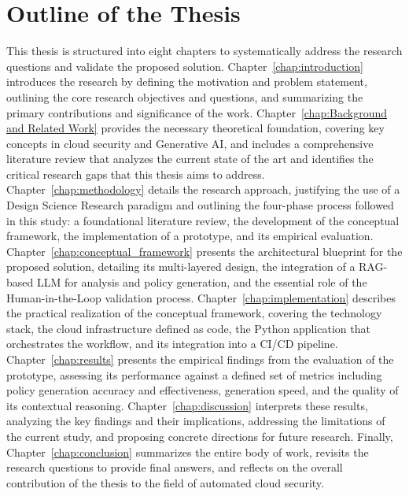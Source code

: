 \section{Outline of the Thesis}
\label{sec:outline}

This thesis is structured into eight chapters to systematically address the research questions and validate the proposed solution. Chapter~\ref{chap:introduction} introduces the research by defining the motivation and problem statement, outlining the core research objectives and questions, and summarizing the primary contributions and significance of the work. Chapter~\ref{chap:Background and Related Work} provides the necessary theoretical foundation, covering key concepts in cloud security and Generative AI, and includes a comprehensive literature review that analyzes the current state of the art and identifies the critical research gaps that this thesis aims to address. Chapter~\ref{chap:methodology} details the research approach, justifying the use of a Design Science Research paradigm and outlining the four-phase process followed in this study: a foundational literature review, the development of the conceptual framework, the implementation of a prototype, and its empirical evaluation. Chapter~\ref{chap:conceptual_framework} presents the architectural blueprint for the proposed solution, detailing its multi-layered design, the integration of a RAG-based LLM for analysis and policy generation, and the essential role of the Human-in-the-Loop validation process. Chapter~\ref{chap:implementation} describes the practical realization of the conceptual framework, covering the technology stack, the cloud infrastructure defined as code, the Python application that orchestrates the workflow, and its integration into a CI/CD pipeline. Chapter~\ref{chap:results} presents the empirical findings from the evaluation of the prototype, assessing its performance against a defined set of metrics including policy generation accuracy and effectiveness, generation speed, and the quality of its contextual reasoning. Chapter~\ref{chap:discussion} interprets these results, analyzing the key findings and their implications, addressing the limitations of the current study, and proposing concrete directions for future research. Finally, Chapter~\ref{chap:conclusion} summarizes the entire body of work, revisits the research questions to provide final answers, and reflects on the overall contribution of the thesis to the field of automated cloud security.

